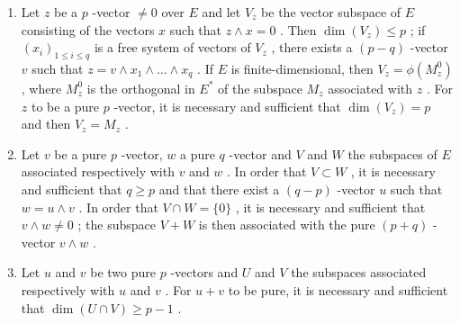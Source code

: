 \begin{enumerate}
\def\labelenumi{(\alph{enumi})}
\item
  Let \(z\) be a \(p\) -vector \(\neq 0\) over \(E\) and let \(V_{z}\) be the vector subspace of \(E\) consisting of the vectors \(x\) such that \(z \wedge x = 0\) . Then \(\dim(V_{z}) \leqslant p\) ; if \((x_{i})_{1 \leqslant i \leqslant q}\) is a free system of vectors of \(V_{z}\) , there exists a \((p - q)\) -vector \(v\) such that \(z = v \wedge x_{1} \wedge \dots \wedge x_{q}\) . If \(E\) is finite-dimensional, then \(V_{z} = \phi(M_{z}^{0})\) , where \(M_{z}^{0}\) is the orthogonal in \(E^{*}\) of the subspace \(M_{z}\) associated with \(z\) . For \(z\) to be a pure \(p\) -vector, it is necessary and sufficient that \(\dim(V_{z}) = p\) and then \(V_{z} = M_{z}\) .
\item
  Let \(v\) be a pure \(p\) -vector, \(w\) a pure \(q\) -vector and \(V\) and \(W\) the subspaces of \(E\) associated respectively with \(v\) and \(w\) . In order that \(V \subset W\) , it is necessary and sufficient that \(q \geqslant p\) and that there exist a \((q - p)\) -vector \(u\) such that \(w = u \wedge v\) . In order that \(V \cap W = \{0\}\) , it is necessary and sufficient that \(v \wedge w \neq 0\) ; the subspace \(V + W\) is then associated with the pure \((p + q)\) -vector \(v \wedge w\) .
\item
  Let \(u\) and \(v\) be two pure \(p\) -vectors and \(U\) and \(V\) the subspaces associated respectively with \(u\) and \(v\) . For \(u + v\) to be pure, it is necessary and sufficient that \(\dim(U \cap V) \geqslant p - 1\) .
\end{enumerate}

